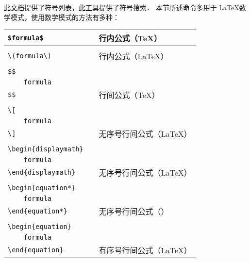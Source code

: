\href{https://ctan.org/tex-archive/info/symbols/comprehensive/}{此文档}提供了符号列表，\href{http://detexify.kirelabs.org/classify.html}{此工具}提供了符号搜索．
本节所述命令多用于 \LaTeX 数学模式，使用数学模式的方法有多种：

\begin{table}[h]
	\centering
	\begin{tabular}{l p{6em} l}
		\verb|$|{\color{gray}\verb|formula|}\verb|$|   && 行内公式（\TeX） \\
		\hline
		                                               && \\
		\verb|\(|{\color{gray}\verb|formula|}\verb|\)| && 行内公式（\LaTeX） \\
		\hline
		                                               && \\
		\verb|$$|                                      && \\
		\verb|    |{\color{gray}\verb|formula|}        && \\
		\verb|$$|                                      && 行间公式（\TeX） \\
		\hline
		                                               && \\
		\verb|\[|                                      && \\
		\verb|    |{\color{gray}\verb|formula|}        && \\
		\verb|\]|                                      && 无序号行间公式（\LaTeX） \\
		\hline
		                                               && \\
		\verb|\begin{displaymath}|                     && \\
		\verb|    |{\color{gray}\verb|formula|}        && \\
		\verb|\end{displaymath}|                       && 无序号行间公式（\LaTeX） \\
		\hline
		                                               && \\
		\verb|\begin{equation*}|                       && \\
		\verb|    |{\color{gray}\verb|formula|}        && \\
		\verb|\end{equation*}|                         && 无序号行间公式（\AmS） \\
		\hline
		                                               && \\
		\verb|\begin{equation}|                        && \\
		\verb|    |{\color{gray}\verb|formula|}        && \\
		\verb|\end{equation}|                          && 有序号行间公式（\LaTeX） \\
		\hline
	\end{tabular}
\end{table}
%

